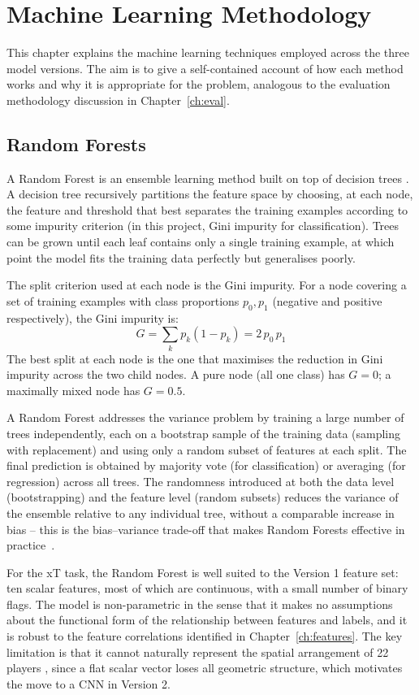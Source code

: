 \chapter{Machine Learning Methodology}\label{ch:methodology}

This chapter explains the machine learning techniques employed across the three model versions. The aim is to give a self-contained account of how each method works and why it is appropriate for the problem, analogous to the evaluation methodology discussion in Chapter~\ref{ch:eval}.

\section{Random Forests}\label{sec:meth_rf}

A Random Forest is an ensemble learning method built on top of decision trees \cite{breiman2001}. A decision tree recursively partitions the feature space by choosing, at each node, the feature and threshold that best separates the training examples according to some impurity criterion (in this project, Gini impurity for classification). Trees can be grown until each leaf contains only a single training example, at which point the model fits the training data perfectly but generalises poorly.

The split criterion used at each node is the Gini impurity. For a node covering a set of training examples with class proportions $p_0, p_1$ (negative and positive respectively), the Gini impurity is:
\[
    G = \sum_{k} p_k(1 - p_k) = 2\,p_0\,p_1
\]
The best split at each node is the one that maximises the reduction in Gini impurity across the two child nodes. A pure node (all one class) has $G = 0$; a maximally mixed node has $G = 0.5$.

A Random Forest addresses the variance problem by training a large number of trees independently, each on a bootstrap sample of the training data (sampling with replacement) and using only a random subset of features at each split. The final prediction is obtained by majority vote (for classification) or averaging (for regression) across all trees. The randomness introduced at both the data level (bootstrapping) and the feature level (random subsets) reduces the variance of the ensemble relative to any individual tree, without a comparable increase in bias -- this is the bias--variance trade-off that makes Random Forests effective in practice~\cite{breiman2001}.

For the xT task, the Random Forest is well suited to the Version 1 feature set: ten scalar features, most of which are continuous, with a small number of binary flags. The model is non-parametric in the sense that it makes no assumptions about the functional form of the relationship between features and labels, and it is robust to the feature correlations identified in Chapter~\ref{ch:features}. The key limitation is that it cannot naturally represent the spatial arrangement of 22 players , since a flat scalar vector loses all geometric structure, which motivates the move to a CNN in Version 2.

